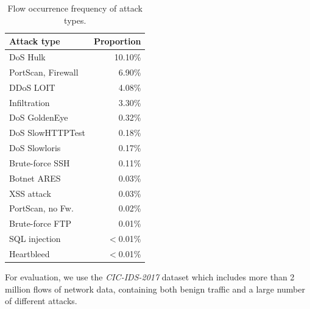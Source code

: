 \documentclass[conference]{IEEEtran}
\begin{document}
\begin{table}[b]
\caption{Flow occurrence frequency of attack types.}
\label{tab:occurrence}
\centering
\begin{tabular}{l r}
\toprule
Attack type & \hspace*{-4mm}Proportion \\ \midrule
DoS Hulk	&	10.10\%	\\
PortScan, Firewall	&	6.90\%	\\
DDoS LOIT	&	4.08\%	\\
Infiltration	&	3.30\%	\\
DoS GoldenEye	&	0.32\%	\\
DoS SlowHTTPTest	&	0.18\%	\\
DoS Slowloris	&	0.17\%	\\
Brute-force SSH	&	0.11\%	\\
Botnet ARES	&	0.03\%	\\
XSS attack	&	0.03\%	\\
PortScan, no Fw.	&	0.02\%	\\
Brute-force FTP	&	0.01\%	\\
SQL injection	&	$<$0.01\%	\\
Heartbleed	&	$<$0.01\%	\\
\bottomrule
\end{tabular}
\end{table}






For evaluation, we use the \textit{CIC-IDS-2017} \cite{sharafaldin2018toward} dataset which includes more than 2 million flows of network data, containing both benign traffic and a large number of different attacks. 
\end{document}
